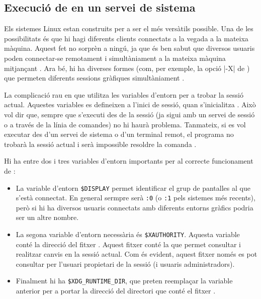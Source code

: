 

\subsection{Execució de  en un servei de sistema}
\label{subsec:xrandr}

Els sistemes Linux estan construits per a ser el més versàtils possible. Una
de les possibilitats és que hi hagi diferents clients connectats a la vegada
a la mateixa màquina. Aquest fet no sorprèn a ningú, ja que és ben sabut que
diversos usuaris poden connectar-se remotament i simultàniament a la mateixa
màquina mitjançant . Ara bé, hi ha diverses formes (com, per exemple,
la opció \ord|-X| de ) que permeten diferents sessions gràfiques
simultàniament \cite{ManSSH}.

La complicació rau en que  utilitza les variables d'entorn per a
trobar la sessió actual. Aquestes variables es defineixen a l'inici de sessió,
quan s'inicialitza . Això vol dir que, sempre que s'executi
 des de la sessió (ja sigui amb un servei de sessió o a través de
la línia de comandes) no hi haurà problema.
Tanmateix, si es vol executar  des d'un servei de sistema o d'un
terminal remot, el programa no trobarà la sessió actual i serà impossible
resoldre la comanda \cite{ArchWiki}.

Hi ha entre dos i tres variables d'entorn importants per al correcte funcionament
de  \cite{XrandrVars}:

\begin{itemize}
    \item La variable d'entorn \verb|$DISPLAY| permet identificar el grup de
    pantalles al que s'està connectat. En general sermpre serà \verb|:0| (o 
    \verb|:1| pels sistemes més recents), però si hi ha diversos usuaris
    connectats amb diferents entorns gràfics podria ser un altre nombre.
    \item La segona variable d'entorn necessària és \verb|$XAUTHORITY|. Aquesta
    variable conté la direcció del fitxer . Aquest fitxer
    conté la  que permet consultar i realitzar canvis en la sessió
    actual. Com és evident, aquest fitxer només es pot consultar per l'usuari
    propietari de la sessió (i usuaris administradors).
    \item Finalment hi ha \verb|$XDG_RUNTIME_DIR|, que preten reemplaçar la
    variable anterior per a portar la direcció del directori que conté el fitxer
    .
\end{itemize}

